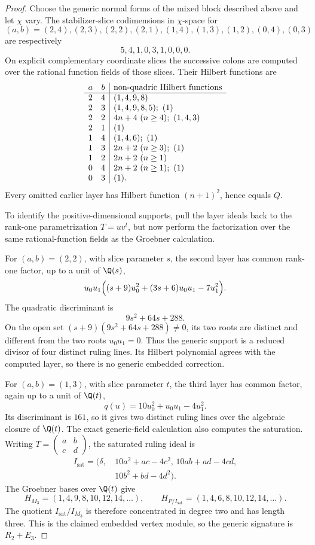 \begin{proof}
Choose the generic normal forms of the mixed block described above and
let \(\chi\) vary.  The stabilizer-slice codimensions in
\(\chi\)-space for
\[
 (a,b)=(2,4),(2,3),(2,2),(2,1),(1,4),(1,3),(1,2),(0,4),(0,3)
\]
are respectively
\[
 5,4,1,0,3,1,0,0,0.
\]
On explicit complementary coordinate slices the successive colons are
computed over the rational function fields of those slices.  Their
Hilbert functions are
\[
\begin{array}{c c|l}
a&b&\text{non-quadric Hilbert functions}\\ \hline
2&4&(1,4,9,8)\\
2&3&(1,4,9,8,5);\ (1)\\
2&2&4n+4\ (n\ge4);\ (1,4,3)\\
2&1&(1)\\
1&4&(1,4,6);\ (1)\\
1&3&2n+2\ (n\ge3);\ (1)\\
1&2&2n+2\ (n\ge1)\\
0&4&2n+2\ (n\ge1);\ (1)\\
0&3&(1).
\end{array}
\]
Every omitted earlier layer has Hilbert function \((n+1)^2\),
hence equals \(Q\).

To identify the positive-dimensional supports, pull the layer ideals
back to the rank-one parametrization \(T=uv^t\), but now perform the
factorization over the same rational-function fields as the Groebner
calculation.

For \((a,b)=(2,2)\), with slice parameter \(s\), the second layer has
common rank-one factor, up to a unit of \(\Q(s)\),
\[
 u_0u_1\Bigl(
 (s+9)u_0^2+(3s+6)u_0u_1-7u_1^2
 \Bigr).
\]
The quadratic discriminant is
\[
 9s^2+64s+288.
\]
On the open set
\((s+9)(9s^2+64s+288)\ne0\), its two roots are distinct and
different from the two roots \(u_0u_1=0\).  Thus the generic support
is a reduced divisor of four distinct ruling lines.  Its Hilbert
polynomial agrees with the computed layer, so there is no generic
embedded correction.

For \((a,b)=(1,3)\), with slice parameter \(t\), the third layer has
common factor, again up to a unit of \(\Q(t)\),
\[
 q(u)=10u_0^2+u_0u_1-4u_1^2.
\]
Its discriminant is \(161\), so it gives two distinct ruling lines
over the algebraic closure of \(\Q(t)\).  The exact generic-field
calculation also computes the saturation.  Writing
\(T=\left(\begin{smallmatrix}a&b\\c&d\end{smallmatrix}\right)\),
the saturated ruling ideal is
\[
\begin{split}
 I_{\mathrm{sat}}=(\delta,\,
 &10a^2+ac-4c^2,\,
 10ab+ad-4cd,\\
 &10b^2+bd-4d^2).
\end{split}
\]
The Groebner bases over \(\Q(t)\) give
\[
 H_{M_3}=(1,4,9,8,10,12,14,\ldots),\qquad
 H_{P/I_{\mathrm{sat}}}=(1,4,6,8,10,12,14,\ldots).
\]
The quotient \(I_{\mathrm{sat}}/I_{M_3}\) is therefore concentrated
in degree two and has length three.  This is the claimed embedded
vertex module, so the generic signature is \(R_2+E_3\).


\end{proof}
